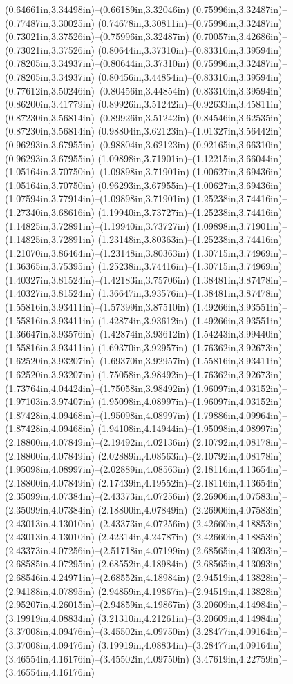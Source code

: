 (0.64661in,3.34498in)--(0.66189in,3.32046in) (0.75996in,3.32487in)--(0.77487in,3.30025in) (0.74678in,3.30811in)--(0.75996in,3.32487in) (0.73021in,3.37526in)--(0.75996in,3.32487in) (0.70057in,3.42686in)--(0.73021in,3.37526in) (0.80644in,3.37310in)--(0.83310in,3.39594in) (0.78205in,3.34937in)--(0.80644in,3.37310in) (0.75996in,3.32487in)--(0.78205in,3.34937in) (0.80456in,3.44854in)--(0.83310in,3.39594in) (0.77612in,3.50246in)--(0.80456in,3.44854in) (0.83310in,3.39594in)--(0.86200in,3.41779in) (0.89926in,3.51242in)--(0.92633in,3.45811in) (0.87230in,3.56814in)--(0.89926in,3.51242in) (0.84546in,3.62535in)--(0.87230in,3.56814in) (0.98804in,3.62123in)--(1.01327in,3.56442in) (0.96293in,3.67955in)--(0.98804in,3.62123in) (0.92165in,3.66310in)--(0.96293in,3.67955in) (1.09898in,3.71901in)--(1.12215in,3.66044in) (1.05164in,3.70750in)--(1.09898in,3.71901in) (1.00627in,3.69436in)--(1.05164in,3.70750in) (0.96293in,3.67955in)--(1.00627in,3.69436in) (1.07594in,3.77914in)--(1.09898in,3.71901in) (1.25238in,3.74416in)--(1.27340in,3.68616in) (1.19940in,3.73727in)--(1.25238in,3.74416in) (1.14825in,3.72891in)--(1.19940in,3.73727in) (1.09898in,3.71901in)--(1.14825in,3.72891in) (1.23148in,3.80363in)--(1.25238in,3.74416in) (1.21070in,3.86464in)--(1.23148in,3.80363in) (1.30715in,3.74969in)--(1.36365in,3.75395in) (1.25238in,3.74416in)--(1.30715in,3.74969in) (1.40327in,3.81524in)--(1.42183in,3.75706in) (1.38481in,3.87478in)--(1.40327in,3.81524in) (1.36647in,3.93576in)--(1.38481in,3.87478in) (1.55816in,3.93411in)--(1.57399in,3.87510in) (1.49266in,3.93551in)--(1.55816in,3.93411in) (1.42874in,3.93612in)--(1.49266in,3.93551in) (1.36647in,3.93576in)--(1.42874in,3.93612in) (1.54243in,3.99440in)--(1.55816in,3.93411in) (1.69370in,3.92957in)--(1.76362in,3.92673in) (1.62520in,3.93207in)--(1.69370in,3.92957in) (1.55816in,3.93411in)--(1.62520in,3.93207in) (1.75058in,3.98492in)--(1.76362in,3.92673in) (1.73764in,4.04424in)--(1.75058in,3.98492in) (1.96097in,4.03152in)--(1.97103in,3.97407in) (1.95098in,4.08997in)--(1.96097in,4.03152in) (1.87428in,4.09468in)--(1.95098in,4.08997in) (1.79886in,4.09964in)--(1.87428in,4.09468in) (1.94108in,4.14944in)--(1.95098in,4.08997in) (2.18800in,4.07849in)--(2.19492in,4.02136in) (2.10792in,4.08178in)--(2.18800in,4.07849in) (2.02889in,4.08563in)--(2.10792in,4.08178in) (1.95098in,4.08997in)--(2.02889in,4.08563in) (2.18116in,4.13654in)--(2.18800in,4.07849in) (2.17439in,4.19552in)--(2.18116in,4.13654in) (2.35099in,4.07384in)--(2.43373in,4.07256in) (2.26906in,4.07583in)--(2.35099in,4.07384in) (2.18800in,4.07849in)--(2.26906in,4.07583in) (2.43013in,4.13010in)--(2.43373in,4.07256in) (2.42660in,4.18853in)--(2.43013in,4.13010in) (2.42314in,4.24787in)--(2.42660in,4.18853in) (2.43373in,4.07256in)--(2.51718in,4.07199in) (2.68565in,4.13093in)--(2.68585in,4.07295in) (2.68552in,4.18984in)--(2.68565in,4.13093in) (2.68546in,4.24971in)--(2.68552in,4.18984in) (2.94519in,4.13828in)--(2.94188in,4.07895in) (2.94859in,4.19867in)--(2.94519in,4.13828in) (2.95207in,4.26015in)--(2.94859in,4.19867in) (3.20609in,4.14984in)--(3.19919in,4.08834in) (3.21310in,4.21261in)--(3.20609in,4.14984in) (3.37008in,4.09476in)--(3.45502in,4.09750in) (3.28477in,4.09164in)--(3.37008in,4.09476in) (3.19919in,4.08834in)--(3.28477in,4.09164in) (3.46554in,4.16176in)--(3.45502in,4.09750in) (3.47619in,4.22759in)--(3.46554in,4.16176in) 